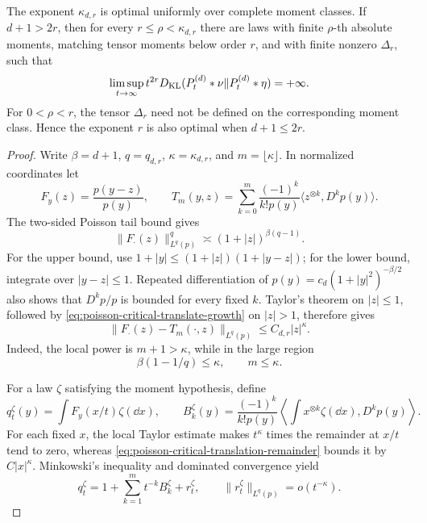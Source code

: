 \begin{theorem}
The exponent \(\kappa_{d,r}\) is optimal uniformly over complete moment
classes.  If \(d+1>2r\), then for every
\(r\le\rho<\kappa_{d,r}\) there are laws with finite \(\rho\)-th absolute
moments, matching tensor moments below order \(r\), and with finite nonzero
\(\Delta_r\), such that
\begin{equation}\label{eq:poisson-all-order-uniform-sharpness}
 \limsup_{t\to\infty}t^{2r}
 D_{\rm KL}(P_t^{(d)}*\nu\|P_t^{(d)}*\eta)=+\infty.
\end{equation}
For \(0<\rho<r\), the tensor \(\Delta_r\) need not be defined on the
corresponding moment class.  Hence the exponent \(r\) is also optimal when
\(d+1\le2r\).
\end{theorem}

\begin{proof}
Write \(\beta=d+1\), \(q=q_{d,r}\), \(\kappa=\kappa_{d,r}\), and
\(m=\lfloor\kappa\rfloor\).  In normalized coordinates let
\[
 F_y(z)=\frac{p(y-z)}{p(y)},\qquad
 T_m(y,z)=\sum_{k=0}^m\frac{(-1)^k}{k!p(y)}
 \langle z^{\otimes k},D^kp(y)\rangle.
\]
The two-sided Poisson tail bound gives
\begin{equation}\label{eq:poisson-critical-translate-growth}
 \|F_\cdot(z)\|_{L^q(p)}^q\asymp(1+|z|)^{\beta(q-1)}.
\end{equation}
For the upper bound, use
\(1+|y|\le(1+|z|)(1+|y-z|)\); for the lower bound, integrate over
\(|y-z|\le1\).  Repeated differentiation of
\(p(y)=c_d(1+|y|^2)^{-\beta/2}\) also shows that
\(D^kp/p\) is bounded for every fixed \(k\).  Taylor's theorem on
\(|z|\le1\), followed by \eqref{eq:poisson-critical-translate-growth} on
\(|z|>1\), therefore gives
\begin{equation}\label{eq:poisson-critical-translation-remainder}
 \|F_\cdot(z)-T_m(\cdot,z)\|_{L^q(p)}
 \le C_{d,r}|z|^\kappa.
\end{equation}
Indeed, the local power is \(m+1>\kappa\), while in the large region
\[
 \beta(1-1/q)\le\kappa,\qquad m\le\kappa.
\]

For a law \(\zeta\) satisfying the moment hypothesis, define
\[
 q_t^\zeta(y)=\int F_y(x/t)\zeta(\dd x),\qquad
 B_k^\zeta(y)=\frac{(-1)^k}{k!p(y)}
 \left\langle\int x^{\otimes k}\zeta(\dd x),D^kp(y)\right\rangle.
\]
For each fixed \(x\), the local Taylor estimate makes \(t^\kappa\) times
the remainder at \(x/t\) tend to zero, whereas
\eqref{eq:poisson-critical-translation-remainder} bounds it by
\(C|x|^\kappa\).  Minkowski's inequality and dominated convergence yield
\begin{equation}\label{eq:poisson-critical-integrated-remainder}
 q_t^\zeta=1+\sum_{k=1}^mt^{-k}B_k^\zeta+r_t^\zeta,
 \qquad \|r_t^\zeta\|_{L^q(p)}=o(t^{-\kappa}).
\end{equation}


\end{proof}
